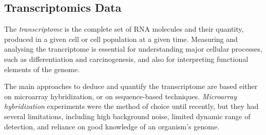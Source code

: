 \subsection{Transcriptomics Data} \label{rnaSeq-data-sect}
The \emph{transcriptome} is the complete set of RNA molecules and their quantity, produced in a given cell or cell population at a given time. Measuring and analysing the trancriptome is essential for understanding major cellular processes, such as differentiation and carcinogenesis, and also for interpreting functional elements of the genome. 

The main approaches to deduce and quantify the transcriptome are based either on microarray hybridization, or on sequence-based techniques. \emph{Microarray hybridization} experiments \citep{Babu2004} were the method of choice until recently, but they had several limitations, including high background noise, limited dynamic range of detection, and reliance on good knowledge of an organism's genome. 

